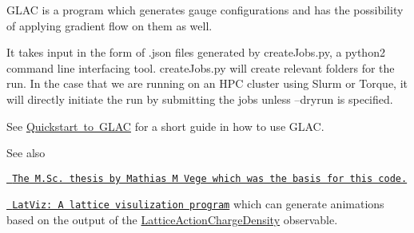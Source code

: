 G\+L\+AC is a program which generates gauge configurations and has the possibility of applying gradient flow on them as well.

It takes input in the form of .json files generated by create\+Jobs.\+py, a python2 command line interfacing tool. create\+Jobs.\+py will create relevant folders for the run. In the case that we are running on an H\+PC cluster using Slurm or Torque, it will directly initiate the run by submitting the jobs unless {\ttfamily --dryrun} is specified.

See \mbox{\hyperlink{page1}{Quickstart to G\+L\+AC}} for a short guide in how to use G\+L\+AC.

\begin{DoxySeeAlso}{See also}

\begin{DoxyItemize}
\item \href{https://github.com/hmvege/LQCDMasterThesis}{\texttt{ The M.\+Sc. thesis by Mathias M Vege which was the basis for this code.}}
\item \href{https://github.com/hmvege/LatViz}{\texttt{ Lat\+Viz\+: A lattice visulization program}} which can generate animations based on the output of the \mbox{\hyperlink{class_lattice_action_charge_density}{Lattice\+Action\+Charge\+Density}} observable. 
\end{DoxyItemize}
\end{DoxySeeAlso}
